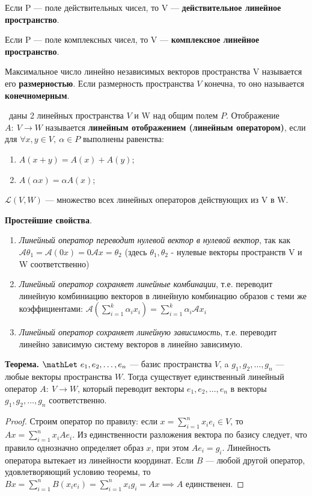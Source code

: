 Если P --- поле действительных чисел, то V --- \textbf{действительное линейное пространство}.

Если P --- поле комплексных чисел, то V --- \textbf{комплексное линейное пространство}.

Максимальное число линейно независимых векторов пространства V называется его \textbf{размерностью}. Если размерность пространства $V$ конечна, то оно называется \textbf{конечномерным}.

\mathLet \ даны 2 линейных пространства $V$ и W над общим полем $P$. Отображение $A :~V \to W$ называется \textbf{линейным отображением (линейным оператором)}, если для $\forall x, y \in V,~\alpha \in P$ выполнены равенства:
\begin{enumerate}
    \item $A(x + y) = A(x) + A(y)$;
    \item $A(\alpha x) = \alpha A(x)$;
\end{enumerate}

$\mathcal{L}(V, W)$ --- множество всех линейных операторов действующих из V в W.

\textbf{Простейшие свойства}.
\begin{enumerate}
    \item \textit{Линейный оператор переводит нулевой вектор в нулевой вектор}, так как $\mathcal{A}\theta_1 = \mathcal{A}(0x) = 0\mathcal{A}x = \theta_2$ (здесь $\theta_1,\theta_2$ - нулевые векторы пространств V и W соответственно)
    \item \textit{Линейный оператор сохраняет линейные комбинации}, т.е. переводит линейную комбиниацию векторов в линейную комбинацию образов с теми же коэффициентами: $\mathcal{A} \left( \sum_{i=1}^{k}\alpha_ix_i \right) = \sum_{i=1}^{k}\alpha_i\mathcal{A}x_i$
    \item \textit{Линейный оператор сохраняет линейную зависимость}, т.е. переводит линейно зависимую систему векторов в линейно зависимую.
\end{enumerate}

\textbf{Теорема.} $\mathLet ~ e_1, e_2,\dots,e_n$ --- базис пространства $V$, a $g_1,g_2,\dots,g_n$ --- любые векторы пространства $W$. Тогда существует единственный линейный оператор $A:~V \to W$, который переводит векторы $e_1, e_2,\dots,e_n$ в векторы $g_1,g_2,\dots,g_n$ соответственно.

\begin{proof} Строим оператор по правилу: если $x = \sum_{i=1}^{n} x_ie_i \in  V$, то $Ax = \sum_{i=1}^{n}x_iAe_i$. Из единственности разложения вектора по базису следует, что правило однозначно определяет образ $x$, при этом $Ae_i = g_i$. Линейность оператора вытекает из линейности координат. Если $B$ --- любой другой оператор, удовлетворяющий условию теоремы, то $Bx = \sum_{i=1}^{n} B(x_ie_i) = \sum_{i=1}^{n} x_ig_i = Ax \implies A$ единственен.
\end{proof}

